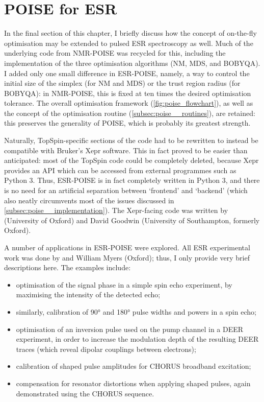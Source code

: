 \section{POISE for ESR}
\label{sec:poise__esrpoise}

In the final section of this chapter, I briefly discuss how the concept of on-the-fly optimisation may be extended to pulsed ESR spectroscopy as well.
Much of the underlying code from NMR-POISE was recycled for this, including the implementation of the three optimisation algorithms (NM, MDS, and BOBYQA).
I added only one small difference in ESR-POISE, namely, a way to control the initial size of the simplex (for NM and MDS) or the trust region radius (for BOBYQA): in NMR-POISE, this is fixed at ten times the desired optimisation tolerance.
The overall optimisation framework (\cref{fig:poise_flowchart}), as well as the concept of the optimisation routine (\cref{subsec:poise__routines}), are retained: this preserves the generality of POISE, which is probably its greatest strength.

Naturally, TopSpin-specific sections of the code had to be rewritten to instead be compatible with Bruker's Xepr software.
This in fact proved to be easier than anticipated: most of the TopSpin code could be completely deleted, because Xepr provides an API which can be accessed from external programmes such as Python 3.
Thus, ESR-POISE is in fact completely written in Python 3, and there is no need for an artificial separation between `frontend' and `backend' (which also neatly circumvents most of the issues discussed in \cref{subsec:poise__implementation}).
The Xepr-facing code was written by \JBV{} (University of Oxford) and David Goodwin (University of Southampton, formerly Oxford).

A number of applications in ESR-POISE were explored.
All ESR experimental work was done by \JBV{} and William Myers (Oxford); thus, I only provide very brief descriptions here.
The examples include:

\begin{itemize}
    \item optimisation of the signal phase in a simple spin echo experiment, by maximising the intensity of the detected echo;
    \item similarly, calibration of \ang{90} and \ang{180} pulse widths and powers in a spin echo;
    \item optimisation of an inversion pulse used on the pump channel in a DEER experiment\autocite{Pannier2000JMR}, in order to increase the modulation depth of the resulting DEER traces (which reveal dipolar couplings between electrons);
    \item calibration of shaped pulse amplitudes for CHORUS broadband excitation\autocite{Foroozandeh2019JMR,Verstraete2021JCP};
    \item compensation for resonator distortions when applying shaped pulses, again demonstrated using the CHORUS sequence.
\end{itemize}

